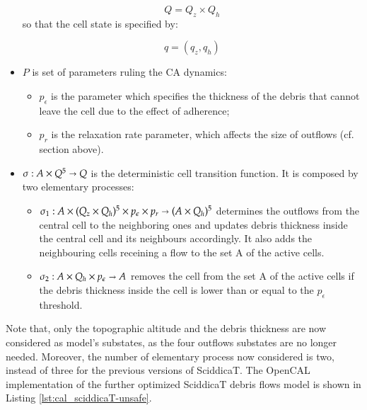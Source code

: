 \begin{itemize}
$$Q = Q_z \times Q_h$$
so that the cell state is specified by:

$$ q = (q_z, q_h)$$

\item   $P$ is set of parameters ruling the CA dynamics:

\begin{itemize}
    \item   $p_\epsilon$ is the parameter which specifies the thickness of the debris that cannot leave the cell due to the effect of adherence;
    \item   $p_r$ is the relaxation rate parameter, which affects the size of outflows (cf. section above).
\end{itemize}

\item $\sigma : A \times Q^5 \shortrightarrow Q$ is the deterministic cell
  transition function. It is composed by two elementary processes:
\begin{itemize}
\item $\sigma_1 : A \times (Q_z \times Q_h)^5 \times p_\epsilon \times
  p_r\shortrightarrow (A \times Q_h)^5$ determines the outflows from
  the central cell to the neighboring ones and updates debris
  thickness inside the central cell and its neighbours accordingly. It
  also adds the neighbouring cells receining a flow to the set A of the
  active cells.

\item $\sigma_2: A \times Q_h \times p_\epsilon \shortrightarrow A$ removes the
  cell from the set A of the active cells if the debris thickness
  inside the cell is lower than or equal to the $p_\epsilon$
  threshold.

\end{itemize}
\end{itemize}

Note that, only the topographic altitude and the debris thickness are
now considered as model's substates, as the four outflows substates
are no longer needed. Moreover, the number of elementary process now
considered is two, instead of three for the previous versions of
SciddicaT. The OpenCAL implementation of the further optimized
SciddicaT debris flows model is shown in Listing
\ref{lst:cal_sciddicaT-unsafe}.



